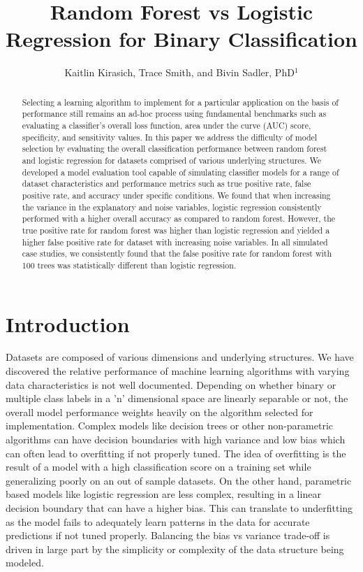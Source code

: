 \documentclass{llncs}
\title{\textbf{Random Forest vs Logistic Regression for Binary Classification}}
\author{Kaitlin Kirasich, Trace Smith, and Bivin Sadler, PhD$^1$}
\institute{Master of Science in Data Science \\ Southern Methodist University \\ Dallas, Texas USA \\
\email{kkirasich@.smu.edu,traces@smu.edu,bsadler@smu.edu}}
\begin{document}
\maketitle

\begin{abstract} 
Selecting a learning algorithm to implement for a particular application on the basis of performance still remains an ad-hoc process using fundamental benchmarks such as evaluating a classifier’s overall loss function, area under the curve (AUC) score, specificity, and sensitivity values. In this paper we address the difficulty of model selection by evaluating the overall classification performance between random forest and logistic regression for datasets comprised of various underlying structures. We developed a model evaluation tool capable of simulating classifier models for a range of dataset characteristics and performance metrics such as true positive rate, false positive rate, and accuracy under specific conditions. We found that when increasing the variance in the explanatory and noise variables, logistic regression consistently performed with a higher overall accuracy as compared to random forest. However, the true positive rate for random forest was higher than logistic regression and yielded a higher false positive rate for dataset with increasing noise variables. In all simulated case studies, we consistently found that the false positive rate for random forest with 100 trees was statistically different than logistic regression. 

\end{abstract}


\section{Introduction}

\noindent 
Datasets are composed of various dimensions and underlying structures. We have discovered the relative performance of machine learning algorithms with varying data characteristics is not well documented. Depending on whether binary or multiple class labels in a 'n' dimensional space are linearly separable or not, the overall model performance weights heavily on the algorithm selected for implementation. Complex models like decision trees or other non-parametric algorithms can have decision boundaries with high variance and low bias which can often lead to overfitting if not properly tuned. The idea of overfitting is the result of a model with a high classification score on a training set while generalizing poorly on an out of sample datasets. On the other hand, parametric based models like logistic regression are less complex, resulting in a linear decision boundary that can have a higher bias. This can translate to underfitting as the model fails to adequately learn patterns in the data for accurate predictions if not tuned properly. Balancing the bias vs variance trade-off is driven in large part by the simplicity or complexity of the data structure being modeled. 
\end{document}
